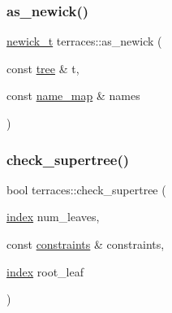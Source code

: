 \mbox{\label{namespaceterraces_acad20ba1f31addcf2c533824cda625a3}} 
\subsubsection{\texorpdfstring{as\+\_\+newick()}{as\_newick()}\hspace{0.1cm}{\footnotesize\ttfamily [2/2]}}
{\footnotesize\ttfamily \hyperlink{structterraces_1_1newick__t}{newick\+\_\+t} terraces\+::as\+\_\+newick (\begin{DoxyParamCaption}\item[{const \hyperlink{namespaceterraces_a07aaf7feec4a22c6cdefc14c5a81bdd0}{tree} \&}]{t,  }\item[{const \hyperlink{namespaceterraces_a4ef0217fe5aed881737d9bc5a8d45dca}{name\+\_\+map} \&}]{names }\end{DoxyParamCaption})\hspace{0.3cm}{\ttfamily [inline]}}

\mbox{\label{namespaceterraces_aa6c37d0703e1d1f0fec828f851585e0e}} 
\subsubsection{\texorpdfstring{check\+\_\+supertree()}{check\_supertree()}\hspace{0.1cm}{\footnotesize\ttfamily [1/2]}}
{\footnotesize\ttfamily bool terraces\+::check\+\_\+supertree (\begin{DoxyParamCaption}\item[{\hyperlink{namespaceterraces_adbc33ccb543d1634e96d0eb02e472c77}{index}}]{num\+\_\+leaves,  }\item[{const \hyperlink{namespaceterraces_a6f603ffd30ed4d902fce6424492e0581}{constraints} \&}]{constraints,  }\item[{\hyperlink{namespaceterraces_adbc33ccb543d1634e96d0eb02e472c77}{index}}]{root\+\_\+leaf }\end{DoxyParamCaption})}

